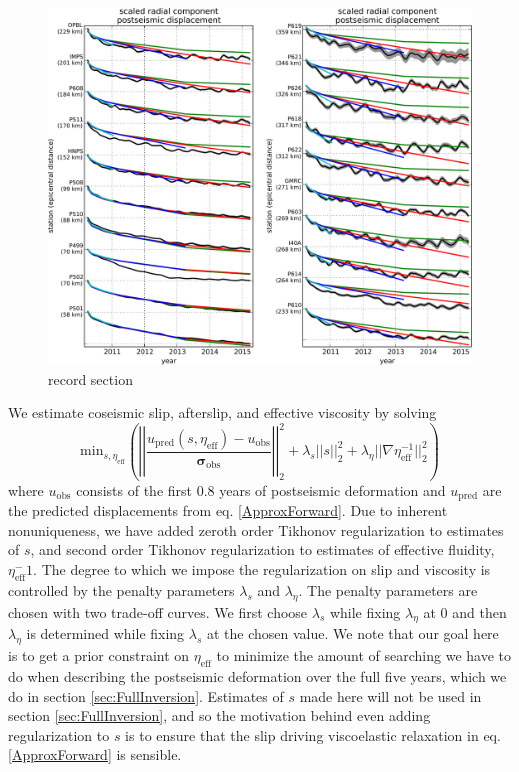 \documentclass[1p]{elsarticle}
\begin{document}
\begin{figure}
\includegraphics[scale=0.5]{Figures/recordsection1}
\centering 
\caption{record section}
\label{fig:RecordSection1}
\end{figure}

We estimate coseismic slip, afterslip, and effective viscosity by solving 
\begin{equation}\label{ObjectiveFunction}
 \mathrm{min}_{s,\eta_\mathrm{eff}} \left(\left|\left|
 \frac{u_\mathrm{pred}(s,\eta_\mathrm{eff}) - u_\mathrm{obs}}
 {\mathbf{\sigma_\mathrm{obs}}}\right|\right|_2^2 + 
 \lambda_s||s||_2^2 + 
 \lambda_\eta||\nabla \eta_{\mathrm{eff}}^{-1}||_2^2\right)
\end{equation} 
where $u_\mathrm{obs}$ consists of the first 0.8 years of postseismic deformation and $u_\mathrm{pred}$ are the predicted displacements from eq. \ref{ApproxForward}.  Due to inherent nonuniqueness, we have added zeroth order Tikhonov regularization to estimates of $s$, and second order Tikhonov regularization to estimates of effective fluidity, $\eta_\mathrm{eff}^-1$. The degree to which we impose the regularization on slip and viscosity is controlled by the penalty parameters $\lambda_s$ and $\lambda_\eta$.  The penalty parameters are chosen with two trade-off curves. We first choose $\lambda_s$ while fixing $\lambda_\eta$ at 0 and then $\lambda_\eta$ is determined while fixing $\lambda_s$ at the chosen value. We note that our goal here is to get a prior constraint on $\eta_{\mathrm{eff}}$ to minimize the amount of searching we have to do when describing the postseismic deformation over the full five years, which we do in section \ref{sec:FullInversion}.  Estimates of $s$ made here will not be used in section \ref{sec:FullInversion}, and so the motivation behind even adding regularization to $s$ is to ensure that the slip driving viscoelastic relaxation in eq. \ref{ApproxForward} is sensible.  
\end{document}
